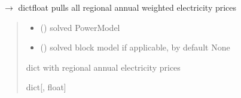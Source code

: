 \documentclass[letterpaper,10pt,english]{sphinxmanual}
\begin{document}
\begin{fulllineitems}
\label{\detokenize{src.integrator.utilities:src.integrator.utilities.regional_annual_prices}}
\pysigstartsignatures
\pysiglinewithargsret
{}
{\sphinxparamcomma {}}
{{ $\rightarrow$ dict\DUrole{p}{{[}}{\hyperref[\detokenize{src.integrator.utilities:src.integrator.utilities.HI}]{\sphinxcrossref{HI}}}float\DUrole{p}{{]}}}}
\pysigstopsignatures
\sphinxAtStartPar
pulls all regional annual weighted electricity prices
\begin{quote}\begin{description}
\begin{itemize}
\item {} 
\sphinxAtStartPar
{} (\sphinxstyleliteralemphasis{\sphinxupquote{{[}}}\sphinxstyleliteralemphasis{\sphinxupquote{, }}\sphinxstyleliteralemphasis{\sphinxupquote{{]}}}) \textendash{} solved PowerModel

\item {} 
\sphinxAtStartPar
{} () \textendash{} solved block model if applicable, by default None

\end{itemize}

\sphinxAtStartPar
dict with regional annual electricity prices

\sphinxAtStartPar
dict{[}{\hyperref[\detokenize{src.integrator.utilities:src.integrator.utilities.HI}]{}}, float{]}

\end{description}\end{quote}

\end{fulllineitems}
\end{document}
